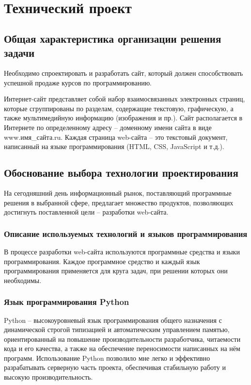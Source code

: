 \section{Технический проект}
\subsection{Общая характеристика организации решения задачи}

Необходимо спроектировать и разработать сайт, который должен способствовать успешной продаже курсов по программированию.

Интернет-сайт представляет собой набор взаимосвязанных электронных страниц, которые сгруппированы по разделам, содержащие текстовую, графическую, а также мультимедийную информацию (изображения и пр.). Сайт располагается в Интернете по определенному адресу – доменному имени сайта в виде www.имя\_сайта.ru. Каждая страница web-сайта – это текстовый документ, написанный на языке программирования (HTML, CSS, JavaScript и т.д.).

\subsection{Обоснование выбора технологии проектирования}

На сегодняшний день информационный рынок, поставляющий программные решения в выбранной сфере, предлагает множество продуктов, позволяющих достигнуть поставленной цели – разработки web-сайта.

\subsubsection{Описание используемых технологий и языков программирования}

В процессе разработки web-сайта используются программные средства и языки программирования. Каждое программное средство и каждый язык программирования применяется для круга задач, при решении которых они необходимы.

\subsubsection{Язык программирования Python}

Python – высокоуровневый язык программирования общего назначения с динамической строгой типизацией и автоматическим управлением памятью, ориентированный на повышение производительности разработчика, читаемости кода и его качества, а также на обеспечение переносимости написанных на нём программ. Использование Python позволило мне легко и эффективно разрабатывать серверную часть проекта, обеспечивая стабильную работу и высокую производительность.

